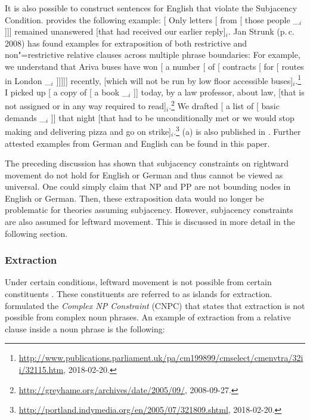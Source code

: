 \noindent
It is also possible to construct sentences for English that violate the Subjacency Condition.
\citet[]{Uszkoreit90a} provides the following example:
\ea
{}[ Only letters [ from [ those people \_$_i$]]] remained
unanswered [that had received our earlier reply]$_i$.
\z
%
Jan Strunk (p.\,c.\, 2008) has found examples for extraposition of both restrictive and non"=restrictive relative clauses across
multiple phrase boundaries:
\eal
\ex For example, we understand that Ariva buses have won [ a number [ of [
      contracts [ for [ routes in London \_$_i$ ]]]]] recently, [which will not be run
by low floor accessible buses]$_i$.\footnote{%
\url{http://www.publications.parliament.uk/pa/cm199899/cmselect/cmenvtra/32ii/32115.htm},
2018-02-20.
}
\ex I picked up [ a copy of [ a book \_$_i$ ]] today, by a law
professor, about law, [that is not assigned or in any way required to read]$_i$.\footnote{%
\url{http://greyhame.org/archives/date/2005/09/}, 2008-09-27.
}
\ex We drafted [ a list of [ basic demands \_$_i$ ]] that night [that had to be
  unconditionally met or we would stop making and 
delivering pizza and go on strike]$_i$.\footnote{%
\url{http://portland.indymedia.org/en/2005/07/321809.shtml}, 2018-02-20.
}
\zl
(a) is also published in . Further attested examples from German and
English can be found in this paper.

The preceding discussion has shown that subjacency constraints on rightward movement do not hold for English or German and thus cannot be
viewed as universal. One could simply claim that NP and PP are not bounding nodes in English or German. Then, these extraposition data would
no longer be problematic for theories assuming subjacency. However, subjacency constraints are also
assumed for leftward movement. This is discussed in more detail in the following section. 

\subsubsection{Extraction}
\label{Abschnitt-Subjazenz-Extraktion}

Under certain conditions, leftward movement is not possible from certain constituents \citep{Ross67}. 
These constituents are referred to as islands for extraction. \citet[Section~4.1]{Ross67} formulated the \emph{Complex NP Constraint} (CNPC) that states that extraction is not possible from complex noun phrases. An example of extraction
  from a relative clause inside a noun phrase is the following:

